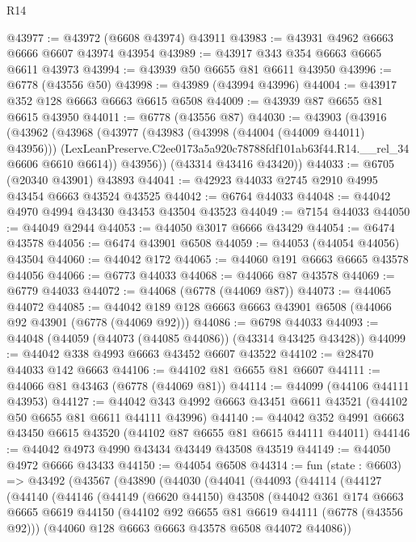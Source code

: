 \begin{lexlean}{R14}
\begin{coremodule}
@43977 := @43972 (@6608 @43974) @43911
@43983 := @43931 @4962 @6663 @6666 @6607 @43974 @43954
@43989 := @43917 @343 @354 @6663 @6665 @6611 @43973
@43994 := @43939 @50 @6655 @81 @6611 @43950
@43996 := @6778 (@43556 @50)
@43998 := @43989 (@43994 @43996)
@44004 := @43917 @352 @128 @6663 @6663 @6615 @6508
@44009 := @43939 @87 @6655 @81 @6615 @43950
@44011 := @6778 (@43556 @87)
@44030 := @43903
    (@43916
      (@43962
        (@43968
          (@43977
            (@43983 (@43998 (@44004 (@44009 @44011) @43956)))
            (LexLeanPreserve.C2ee0173a5a920c78788fdf101ab63f44.R14.__rel_34 @6606 @6610 @6614))
          @43956))
      (@43314 @43416 @43420))
@44033 := @6705 (@20340 @43901) @43893
@44041 := @42923 @44033 @2745 @2910 @4995 @43454 @6663 @43524 @43525
@44042 := @6764 @44033
@44048 := @44042 @4970 @4994 @43430 @43453 @43504 @43523
@44049 := @7154 @44033
@44050 := @44049 @2944
@44053 := @44050 @3017 @6666 @43429
@44054 := @6474 @43578
@44056 := @6474 @43901 @6508
@44059 := @44053 (@44054 @44056) @43504
@44060 := @44042 @172
@44065 := @44060 @191 @6663 @6665 @43578 @44056
@44066 := @6773 @44033
@44068 := @44066 @87 @43578
@44069 := @6779 @44033
@44072 := @44068 (@6778 (@44069 @87))
@44073 := @44065 @44072
@44085 := @44042 @189 @128 @6663 @6663 @43901 @6508 (@44066 @92 @43901 (@6778 (@44069 @92)))
@44086 := @6798 @44033
@44093 := @44048 (@44059 (@44073 (@44085 @44086)) (@43314 @43425 @43428))
@44099 := @44042 @338 @4993 @6663 @43452 @6607 @43522
@44102 := @28470 @44033 @142 @6663
@44106 := @44102 @81 @6655 @81 @6607
@44111 := @44066 @81 @43463 (@6778 (@44069 @81))
@44114 := @44099 (@44106 @44111 @43953)
@44127 := @44042 @343 @4992 @6663 @43451 @6611 @43521 (@44102 @50 @6655 @81 @6611 @44111 @43996)
@44140 := @44042 @352 @4991 @6663 @43450 @6615 @43520 (@44102 @87 @6655 @81 @6615 @44111 @44011)
@44146 := @44042 @4973 @4990 @43434 @43449 @43508 @43519
@44149 := @44050 @4972 @6666 @43433
@44150 := @44054 @6508
@44314 := fun (state : @6603) =>
  @43492
    (@43567
      (@43890
        (@44030
          (@44041
            (@44093
              (@44114
                (@44127
                  (@44140
                    (@44146
                      (@44149
                        (@6620 @44150)
                        @43508
                        (@44042
                          @361
                          @174
                          @6663
                          @6665
                          @6619
                          @44150
                          (@44102 @92 @6655 @81 @6619 @44111 (@6778 (@43556 @92)))
                          (@44060 @128 @6663 @6663 @43578 @6508 @44072 @44086))

\end{coremodule}
\end{lexlean}
